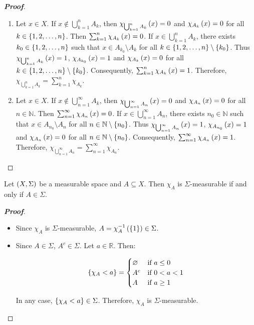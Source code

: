 \begin{proposition}
\begin{proof}[\rm\textbf{Proof}]
\begin{enumerate}
      Therefore, $\chi_{A\cap B}\pr{x}=\chi_A\pr{x}\cdot\chi_B\pr{x}$ and $\chi_{A\cup B}\pr{x}=\chi_A\pr{x}+\chi_B\pr{x}-\chi_{A\cap B}\pr{x}$.
      \item Let $x\in X$. If $x\notin\bigcup_{k=1}^{n}{A_k}$, then $\chi_{\bigcup_{k=1}^{n}{A_k}}\left(x\right)=0$ and $\chi_{A_k}\left(x\right)=0$ for all $k\in\left\{1,2,\dots, n\right\}$. Then $\sum_{k=1}^{n}{\chi_{A_k}\left(x\right)}=0$. If $x\in\bigcup_{k=1}^{n}{A_k}$, there exists $k_0\in\left\{1,2,\dots,n\right\}$ such that $x\in A_{k_0}\setminus A_k$ for all $k\in\left\{1,2,\dots,n\right\}\setminus\left\{k_0\right\}$. Thus $\chi_{\bigcup_{k=1}^{n}{A_k}}\left(x\right)=1$, $\chi_{A_{k_0}}\left(x\right)=1$ and $\chi_{A_k}\left(x\right)=0$ for all $k\in\left\{1,2,\dots,n\right\}\setminus\left\{k_0\right\}$. Consequently, $\sum_{k=1}^{n}{\chi_{A_k}\left(x\right)}=1$. Therefore, $\chi_{\bigcup_{k=1}^{n}{A_k}}=\sum_{k=1}^{n}{\chi_{A_k}}$.
      \item Let $x\in X$. If $x\notin\bigcup_{n=1}^{\infty}{A_k}$, then $\chi_{\bigcup_{n=1}^{\infty}{A_n}}\left(x\right)=0$ and $\chi_{A_n}\left(x\right)=0$ for all $n\in\mathbb{N}$. Then $\sum_{n=1}^{\infty}{\chi_{A_n}\left(x\right)}=0$. If $x\in\bigcup_{n=1}^{\infty}{A_n}$, there exists $n_0\in\mathbb{N}$ such that $x\in A_{n_0}\setminus A_n$ for all $n\in\mathbb{N}\setminus\left\{n_0\right\}$. Thus $\chi_{\bigcup_{n=1}^{\infty}{A_n}}\left(x\right)=1$, $\chi_{A_{n_0}}\left(x\right)=1$ and $\chi_{A_n}\left(x\right)=0$ for all $n\in\mathbb{N}\setminus\left\{n_0\right\}$. Consequently, $\sum_{n=1}^{\infty}{\chi_{A_n}\left(x\right)}=1$. Therefore, $\chi_{\bigcup_{n=1}^{\infty}{A_n}}=\sum_{n=1}^{\infty}{\chi_{A_n}}$.
    \end{enumerate}
    
  \end{proof}
\end{proposition}

\begin{proposition}
  Let $\left(X,\Sigma\right)$ be a measurable space and $A\subseteq X$. Then $\chi_A$ is $\Sigma$-measurable if and only if $A\in\Sigma$.
  \begin{proof}[\rm\textbf{Proof}]
    \hfill
    \begin{itemize}
      \item[\boxed{\Rightarrow}] Since $\chi_A$ is $\Sigma$-measurable, $A=\chi_A^{-1}\left(\left\{1\right\}\right)\in\Sigma$.
      \item[\boxed{\Leftarrow}] Since $A\in\Sigma$, $A^c\in\Sigma$. Let $a\in\mathbb{R}$. Then:
      
      \begin{equation}
        \left\{\chi_A<a\right\}=\begin{cases}
          \varnothing & \text{if $a\leq 0$}\\
          A^c & \text{if $0<a<1$} \\
          A & \text{if $a\geq 1$}
        \end{cases}
      \end{equation}

      In any case, $\left\{\chi_A<a\right\}\in\Sigma$. Therefore, $\chi_A$ is $\Sigma$-measurable.
    \end{itemize}
  \end{proof}
\end{proposition}

